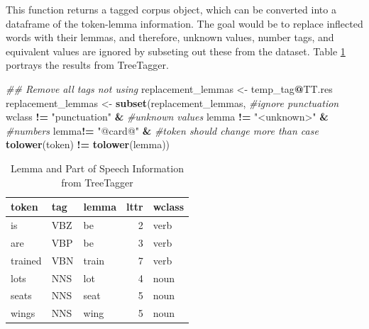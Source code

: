 \documentclass[man]{apa6}
\newenvironment{Shaded}{\begin{snugshade}}{\end{snugshade}}
\newcommand{\CommentTok}[1]{\textcolor[rgb]{0.56,0.35,0.01}{\textit{#1}}}
\newcommand{\KeywordTok}[1]{\textcolor[rgb]{0.13,0.29,0.53}{\textbf{#1}}}
\newcommand{\NormalTok}[1]{#1}
\newcommand{\OperatorTok}[1]{\textcolor[rgb]{0.81,0.36,0.00}{\textbf{#1}}}
\newcommand{\StringTok}[1]{\textcolor[rgb]{0.31,0.60,0.02}{#1}}
\begin{document}
\normalsize

This function returns a tagged corpus object, which can be converted into a dataframe of the token-lemma information. The goal would be to replace inflected words with their lemmas, and therefore, unknown values, number tags, and equivalent values are ignored by subseting out these from the dataset. Table \ref{tab:tab2} portrays the results from TreeTagger.

\scriptsize

\begin{Shaded}
\begin{Highlighting}[]
\CommentTok{## Remove all tags not using}
\NormalTok{replacement_lemmas <-}\StringTok{ }\NormalTok{temp_tag}\OperatorTok{@}\NormalTok{TT.res}
\NormalTok{replacement_lemmas <-}\StringTok{ }\KeywordTok{subset}\NormalTok{(replacement_lemmas, }
                             \CommentTok{#ignore punctuation}
\NormalTok{                             wclass }\OperatorTok{!=}\StringTok{ "punctuation"} \OperatorTok{&}
\StringTok{                             }\CommentTok{#unknown values}
\StringTok{                             }\NormalTok{lemma }\OperatorTok{!=}\StringTok{ "<unknown>"} \OperatorTok{&}\StringTok{ }
\StringTok{                             }\CommentTok{#numbers}
\StringTok{                             }\NormalTok{lemma}\OperatorTok{!=}\StringTok{ "@card@"} \OperatorTok{&}\StringTok{ }
\StringTok{                             }\CommentTok{#token should change more than case}
\StringTok{                             }\KeywordTok{tolower}\NormalTok{(token) }\OperatorTok{!=}\StringTok{ }\KeywordTok{tolower}\NormalTok{(lemma)) }
\end{Highlighting}
\end{Shaded}

\normalsize

\begin{table}[t]

\caption{\label{tab:tab2}Lemma and Part of Speech Information from TreeTagger}
\centering
\begin{tabular}{lllrl}
\toprule
token & tag & lemma & lttr & wclass\\
\midrule
is & VBZ & be & 2 & verb\\
are & VBP & be & 3 & verb\\
trained & VBN & train & 7 & verb\\
lots & NNS & lot & 4 & noun\\
seats & NNS & seat & 5 & noun\\
\addlinespace
wings & NNS & wing & 5 & noun\\
\bottomrule
\end{tabular}
\end{table}
\end{document}
